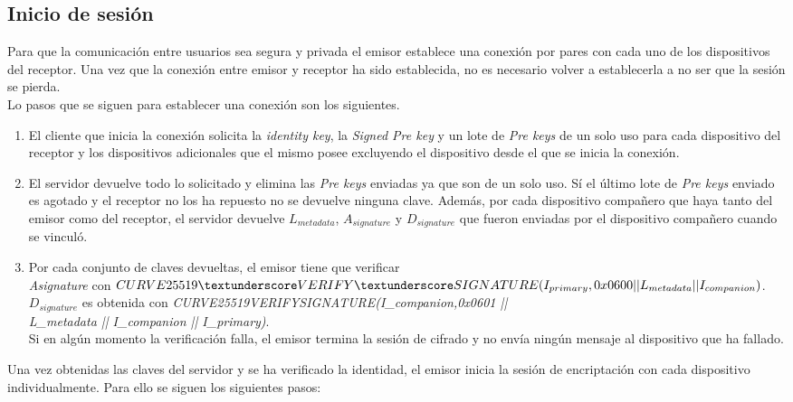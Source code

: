 \subsection{Inicio de sesión}
Para que la comunicación entre usuarios sea segura y privada el emisor establece una conexión por pares con cada uno de los dispositivos del receptor. Una vez que la conexión entre emisor y receptor ha sido establecida, no es necesario volver a establecerla a no ser que la sesión se pierda.\\
Lo pasos que se siguen para establecer una conexión son los siguientes.
\begin{enumerate}
	\item El cliente que inicia la conexión solicita la \emph{identity key}, la \emph{Signed Pre key} y un lote de \emph{Pre keys} de un solo uso para cada dispositivo del receptor y los dispositivos adicionales que el mismo posee excluyendo el dispositivo desde el que se inicia la conexión. 
	\item El servidor devuelve todo lo solicitado y elimina las \emph{Pre keys} enviadas ya que son de un solo uso. Sí el último lote de \emph{Pre keys} enviado es agotado y el receptor no los ha repuesto no se devuelve ninguna clave. Además, por cada dispositivo compañero que haya tanto del emisor como del receptor, el servidor devuelve $L_{metadata}$, $A_{signature}$ y $D_{signature}$ que fueron enviadas por el dispositivo compañero cuando se vinculó.
	\item Por cada conjunto de claves devueltas, el emisor tiene que verificar\\ \emph{Asignature} con $CURVE25519\textunderscore VERIFY \textunderscore SIGNATURE(I_{primary}, 0x0600 || L_{metadata} || I_{companion})$.\\
	$D_{signature}$ es obtenida con \emph{CURVE25519\textunderscore VERIFY\textunderscore SIGNATURE(I_{companion},0x0601 ||\\ L_{metadata} || I_{companion} || I_{primary})}.\\
	Si en algún momento la verificación falla, el emisor termina la sesión de cifrado y no envía ningún mensaje al dispositivo que ha fallado.
\end{enumerate}
Una vez obtenidas las claves del servidor y se ha verificado la identidad, el emisor inicia la sesión de encriptación con cada dispositivo individualmente. Para ello se siguen los siguientes pasos:
